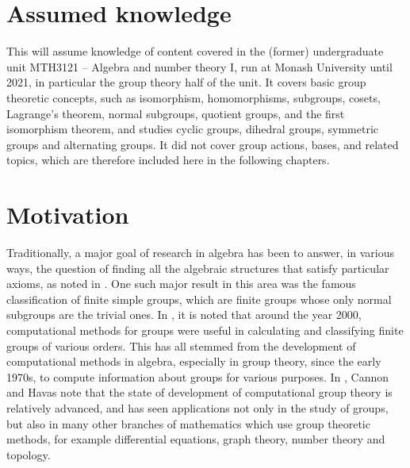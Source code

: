 \section{Assumed knowledge}

This \thesis{} will assume knowledge of content covered in the (former) undergraduate unit MTH3121 -- Algebra and number theory I, run at Monash University until 2021, in particular the group theory half of the unit. It covers basic group theoretic concepts, such as isomorphism, homomorphisms, subgroups, cosets, Lagrange's theorem, normal subgroups, quotient groups, and the first isomorphism theorem, and studies cyclic groups, dihedral groups, symmetric groups and alternating groups. It did not cover group actions, bases, and related topics, which are therefore included here in the following chapters.

\section{Motivation}

Traditionally, a major goal of research in algebra has been to answer, in various ways, the question of finding all the algebraic structures that satisfy particular axioms, as noted in \cite{cannon_havas1992}. One such major result in this area was the famous classification of finite simple groups, which are finite groups whose only normal subgroups are the trivial ones. In \cite{solomon2001}, it is noted that around the year 2000, computational methods for groups were useful in calculating and classifying finite groups of various orders. This has all stemmed from the development of computational methods in algebra, especially in group theory, since the early 1970s, to compute information about groups for various purposes. In \cite{cannon_havas1992}, Cannon and Havas note that the state of development of computational group theory is relatively advanced, and has seen applications not only in the study of groups, but also in many other branches of mathematics which use group theoretic methods, for example differential equations, graph theory, number theory and topology.

